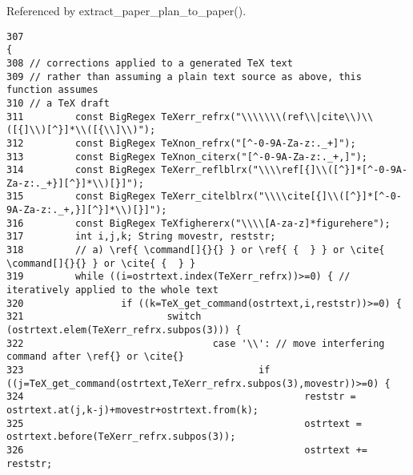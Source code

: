 Referenced by extract\_\-paper\_\-plan\_\-to\_\-paper().



\footnotesize\begin{verbatim}307                                                                       {
308 // corrections applied to a generated TeX text
309 // rather than assuming a plain text source as above, this function assumes
310 // a TeX draft
311         const BigRegex TeXerr_refrx("\\\\\\\(ref\\|cite\\)\\([{]\\)[^}]*\\([{\\]\\)");
312         const BigRegex TeXnon_refrx("[^-0-9A-Za-z:._+]");
313         const BigRegex TeXnon_citerx("[^-0-9A-Za-z:._+,]");
314         const BigRegex TeXerr_reflblrx("\\\\ref[{]\\([^}]*[^-0-9A-Za-z:._+}][^}]*\\)[}]");
315         const BigRegex TeXerr_citelblrx("\\\\cite[{]\\([^}]*[^-0-9A-Za-z:._+,}][^}]*\\)[}]");
316         const BigRegex TeXfighererx("\\\\[A-za-z]*figurehere");
317         int i,j,k; String movestr, reststr;
318         // a) \ref{ \command[]{}{} } or \ref{ {  } } or \cite{ \command[]{}{} } or \cite{ {  } }
319         while ((i=ostrtext.index(TeXerr_refrx))>=0) { // iteratively applied to the whole text
320                 if ((k=TeX_get_command(ostrtext,i,reststr))>=0) {
321                         switch (ostrtext.elem(TeXerr_refrx.subpos(3))) {
322                                 case '\\': // move interfering command after \ref{} or \cite{}
323                                         if ((j=TeX_get_command(ostrtext,TeXerr_refrx.subpos(3),movestr))>=0) {
324                                                 reststr = ostrtext.at(j,k-j)+movestr+ostrtext.from(k);
325                                                 ostrtext = ostrtext.before(TeXerr_refrx.subpos(3));
326                                                 ostrtext += reststr;

\end{verbatim}
